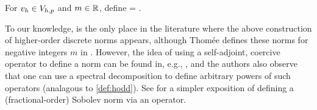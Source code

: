 For $v_{h} \in V_{h,p}$ and $m \in \mathbb R$, define
\beqs
\Nmhn{\vh} = .
\eeqs
\ede






To our knowledge, \cite{DuWu:15} is the only place in the literature where the above construction of higher-order discrete norms appears, although Thom\'{e}e defines these norms for negative integers $m$ in \cite[Equation above Lemma 1]{Th:80}. However, the idea of using a self-adjoint, coercive operator to define a norm can be found in, e.g., \cite[Section 2.1]{LiMa:72}, and the authors also observe \cite[Text at the bottom of page 9]{LiMa:72} that one can use a spectral decomposition to define arbitrary powers of such operators (analagous to \cref{def:hodd}). See \cite[Section 2.1]{BaKuMa:19} for a simpler exposition of defining a (fractional-order) Sobolev norm via an operator.

